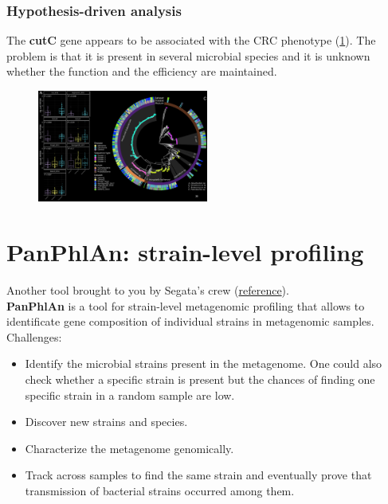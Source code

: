 \subsubsection{Hypothesis-driven analysis}

The \textbf{cutC} gene appears to be associated with the CRC phenotype (\ref{fig:cutC}). The problem is that it is present in several microbial species and it is unknown whether the function and the efficiency are maintained.

\begin{figure}[h]
\centering
\includegraphics[width=0.5\textwidth]{cutC.png}
\caption{\label{fig:cutC}}
\end{figure}

\section{PanPhlAn: strain-level profiling}

Another tool brought to you by Segata’s crew (\href{http://segatalab.cibio.unitn.it/tools/panphlan/index.html}{reference}). \\

\textbf{PanPhlAn} is a tool for strain-level metagenomic profiling that allows to identificate gene composition of individual strains in metagenomic samples.\\ 

Challenges:
\begin{itemize}
    \item Identify the microbial strains present in the metagenome. One could also check whether a specific strain is present but the chances of finding one specific strain in a random sample are low.
    \item Discover new strains and species.
    \item Characterize the metagenome genomically.
    \item Track across samples to find the same strain and eventually prove that transmission of bacterial strains occurred among them.
\end{itemize}

